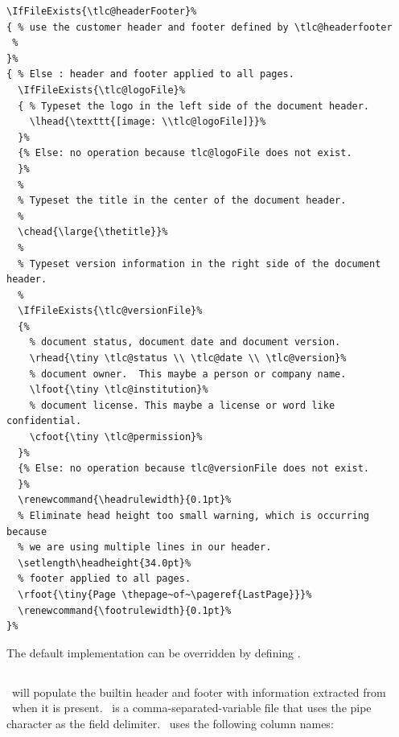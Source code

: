 \documentclass[12pt]{tlc-article}
\begin{document}
\begin{lstlisting}[basicstyle=\tiny]
\IfFileExists{\tlc@headerFooter}%
{ % use the customer header and footer defined by \tlc@headerfooter
 %
}%
{ % Else : header and footer applied to all pages.
  \IfFileExists{\tlc@logoFile}%
  { % Typeset the logo in the left side of the document header.
    \lhead{\texttt{[image: \\tlc@logoFile]}}%
  }%
  {% Else: no operation because tlc@logoFile does not exist.
  }%
  %
  % Typeset the title in the center of the document header.
  %
  \chead{\large{\thetitle}}%
  %
  % Typeset version information in the right side of the document header.
  %
  \IfFileExists{\tlc@versionFile}%
  {%
    % document status, document date and document version.
    \rhead{\tiny \tlc@status \\ \tlc@date \\ \tlc@version}%
    % document owner.  This maybe a person or company name.
    \lfoot{\tiny \tlc@institution}%
    % document license. This maybe a license or word like confidential.
    \cfoot{\tiny \tlc@permission}%
  }%
  {% Else: no operation because tlc@versionFile does not exist.
  }%
  \renewcommand{\headrulewidth}{0.1pt}%
  % Eliminate head height too small warning, which is occurring because
  % we are using multiple lines in our header.
  \setlength\headheight{34.0pt}%
  % footer applied to all pages.
  \rfoot{\tiny{Page \thepage~of~\pageref{LastPage}}}%
  \renewcommand{\footrulewidth}{0.1pt}%
}%
\end{lstlisting}

The default implementation can be overridden by defining \tlcHF.

\tlcVspace

%

\clearpage
\subsection{\tlcVE} \label{sec:version}
\tlcA\ will populate the builtin header and footer with information extracted
from \tlcVE\ when it is present.  \tlcVE\ is a comma-separated-variable file
that uses the pipe character as the field delimiter.  \tlcVE\ uses the following
column names:
\end{document}
